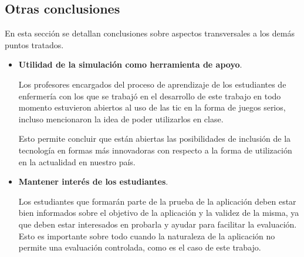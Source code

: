 \subsection{Otras conclusiones}

En esta sección se detallan conclusiones sobre aspectos transversales 
a los demás puntos tratados.

\begin{itemize}
\item \textbf{Utilidad de la simulación como herramienta de apoyo}.

Los profesores encargados del proceso de aprendizaje de los estudiantes de
enfermería con los que se trabajó en el desarrollo de este trabajo en todo
momento estuvieron abiertos al uso de las \Gls{tic} en la forma de juegos
serios, incluso mencionaron la idea de poder utilizarlos en clase. 

Esto permite concluir que están abiertas las posibilidades de inclusión de la
tecnología en formas más innovadoras con respecto a la forma de utilización en
la actualidad en nuestro país.

\item \textbf{Mantener interés de los estudiantes}.

Los estudiantes que formarán parte de la prueba de la aplicación deben estar
bien informados sobre el objetivo de la aplicación y la validez de la misma, 
ya que deben estar interesados en probarla y ayudar para facilitar la 
evaluación. Esto es importante sobre todo cuando la naturaleza de la 
aplicación no permite una evaluación controlada, como es el caso de este 
trabajo.

\end{itemize}

